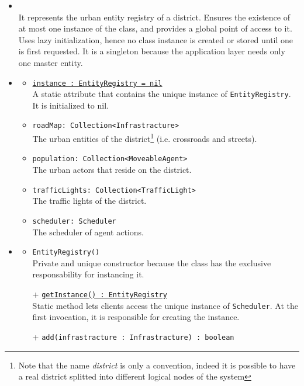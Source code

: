 \begin{itemize}
  \item \textbf{\descr} \\
  It represents the urban entity registry of a district.
  Ensures the existence of at most one instance of the class, 
  and provides a global point of access to it.
  Uses lazy initialization, hence no class instance is created 
  or stored until one is first requested.
  It is a singleton because the application layer needs 
  only one master entity.
  \item \textbf{\attrs}
  \begin{itemize}
    \item \texttt{\underline{instance : EntityRegistry = nil}} \\
    A static attribute that contains the unique instance of \texttt{EntityRegistry}.
    It is initialized to nil.
    \item \texttt{roadMap: Collection<Infrastracture>} \\
    The urban entities of the district\footnote{Note that the name 
    \textit{district} is only a convention, indeed it is possible to have a 
    real district splitted into different logical nodes of the system}
    (i.e. crossroads and streets). 
    \item \texttt{population: Collection<MoveableAgent>} \\
    The urban actors that reside on the district.
    \item \texttt{trafficLights: Collection<TrafficLight>} \\
    The traffic lights of the district.
    \item \texttt{scheduler: Scheduler} \\
    The scheduler of agent actions.
  \end{itemize}
  \item \textbf{\ops}
  \begin{itemize}
    \item \texttt{EntityRegistry()} \\
    Private and unique constructor because the class has the exclusive 
    responsability for instancing it.
    \item[+] \texttt{\underline{getInstance() : EntityRegistry}} \\
    Static method lets clients access the unique instance 
    of \texttt{Scheduler}. At the first invocation, it is responsible 
    for creating the instance.
    \item[+] \texttt{add(infrastracture : Infrastracture) : boolean} \\

\end{itemize}
\end{itemize}
